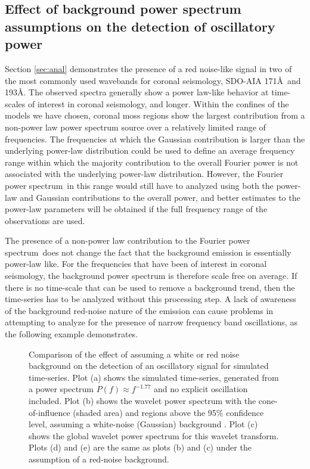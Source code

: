 \documentclass[preprint2]{aastex}
\newcommand{\PS}{power spectrum}
\newcommand{\Fps}{Fourier \PS}
\begin{document}
\subsection{Effect of background power spectrum assumptions on the
  detection of oscillatory power}
\label{ssec:corseis}

Section \ref{sec:anal} demonstrates the presence of a red
noise-like signal in two of the most commonly used wavebands for
coronal seismology, SDO-AIA 171\AA\ and 193\AA.  The observed spectra
generally show a power law-like behavior at time-scales of interest in
coronal seismology, and longer.  Within the confines of the models we
have chosen, coronal moss regions show the largest contribution from a
non-power law power spectrum source over a relatively limited range of
frequencies.  The frequencies at which the Gaussian contribution is
larger than the underlying power-law distribution could be used to
define an average frequency range within which the majority
contribution to the overall Fourier power is not associated with the
underlying power-law distribution.  However, the \Fps\ in this range
would still have to analyzed using both the power-law and Gaussian
contributions to the overall power, and better estimates to the
power-law parameters will be obtained if the full frequency range of
the observations are used.

The presence of a non-power law contribution to the \Fps\ does not
change the fact that the background emission is essentially power-law
like.  For the frequencies that have been of interest in coronal
seismology, the background power spectrum is therefore scale free on
average.  If there is no time-scale that can be used to remove a
background trend, then the time-series has to be analyzed without this
processing step.  A lack of awareness of the background red-noise
nature of the emission can cause problems in attempting to analyze for
the presence of narrow frequency band oscillations, as the following
example demonstrates.

\begin{figure}
\caption{Comparison of the effect of assuming a white or red noise
  background on the detection of an oscillatory signal for simulated
  time-series.  Plot (a) shows the simulated time-series, generated
  from a power spectrum \protect$P(f)\approx f^{-1.77}$ and no
  explicit oscillation included.  Plot (b) shows the wavelet power
  spectrum with the cone-of-influence (shaded area) and regions above
  the 95\% confidence level, assuming a white-noise (Gaussian)
 background .  Plot (c) shows the global wavelet power spectrum for
  this wavelet transform.  Plots (d) and (e) are the same as plots (b)
  and (c) under the assumption of a red-noise background.}
\label{fig:comparison}
\end{figure}
\end{document}
